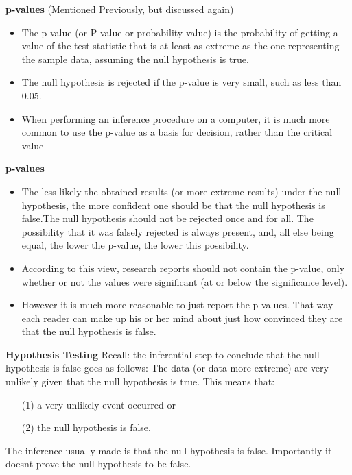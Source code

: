 \documentclass[a4]{beamer}
\begin{document}
{
\noindent \textbf{p-values}
(Mentioned Previously, but discussed again)
\begin{itemize}
\item The p-value (or P-value or probability value) is the probability of getting a value of the test statistic that is at least as extreme as the one representing the sample data, assuming the null hypothesis is true.
\item The null hypothesis is rejected if the p-value is very small, such as less than 0.05.
\item When performing an inference procedure on a computer, it is much more common to use the p-value as a basis for decision, rather than the critical value
\end{itemize}
}




\noindent \textbf{p-values}
\begin{itemize}
\item The less likely the obtained results (or more extreme results) under the null hypothesis, the more confident one should be that the null hypothesis is false.The null hypothesis should not be rejected once and for all. The possibility that it was falsely rejected is always present, and, all else being equal, the lower the p-value, the lower this possibility.
\item According to this view, research reports should not contain the p-value, only whether or not the values were significant (at or below the significance level).
\item
However it is much more reasonable to just report the p-values. That way each reader can make up his or her mind about just how convinced they are that the null hypothesis is false.
\end{itemize}


\noindent \textbf{Hypothesis Testing}
\large
Recall: the inferential step to conclude that the null hypothesis is false goes as follows: The data (or data more extreme) are very unlikely given that the null hypothesis is true.
\bigskip
This means that:
\begin{itemize}\item [(1)] a very unlikely event occurred or
\item[(2)] the null hypothesis is false. \end{itemize}
The inference usually made is that the null hypothesis is false. Importantly it doesnt prove the null hypothesis to be false.
\end{document}
